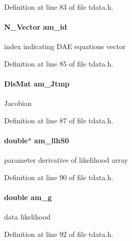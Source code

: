 Definition at line 83 of file tdata.\+h.

\hypertarget{struct_temp_data_ad918917fdce710fbd6fe9774e35bfcfb}{}
\paragraph[{am\+\_\+id}]{\setlength{\rightskip}{0pt plus 5cm}N\+\_\+\+Vector am\+\_\+id}\label{struct_temp_data_ad918917fdce710fbd6fe9774e35bfcfb}
index indicating D\+A\+E equations vector 

Definition at line 85 of file tdata.\+h.

\hypertarget{struct_temp_data_aa850cd4b6b24d0b98b4aac8f42a057a1}{}
\paragraph[{am\+\_\+\+Jtmp}]{\setlength{\rightskip}{0pt plus 5cm}Dls\+Mat am\+\_\+\+Jtmp}\label{struct_temp_data_aa850cd4b6b24d0b98b4aac8f42a057a1}
Jacobian 

Definition at line 87 of file tdata.\+h.

\hypertarget{struct_temp_data_a542f10e5df61799d1c7c7d7e6ff18663}{}
\paragraph[{am\+\_\+llh\+S0}]{\setlength{\rightskip}{0pt plus 5cm}double$\ast$ am\+\_\+llh\+S0}\label{struct_temp_data_a542f10e5df61799d1c7c7d7e6ff18663}
parameter derivative of likelihood array 

Definition at line 90 of file tdata.\+h.

\hypertarget{struct_temp_data_ae80bd7f1abedcaafe56c6a78384b5542}{}
\paragraph[{am\+\_\+g}]{\setlength{\rightskip}{0pt plus 5cm}double am\+\_\+g}\label{struct_temp_data_ae80bd7f1abedcaafe56c6a78384b5542}
data likelihood 

Definition at line 92 of file tdata.\+h.

